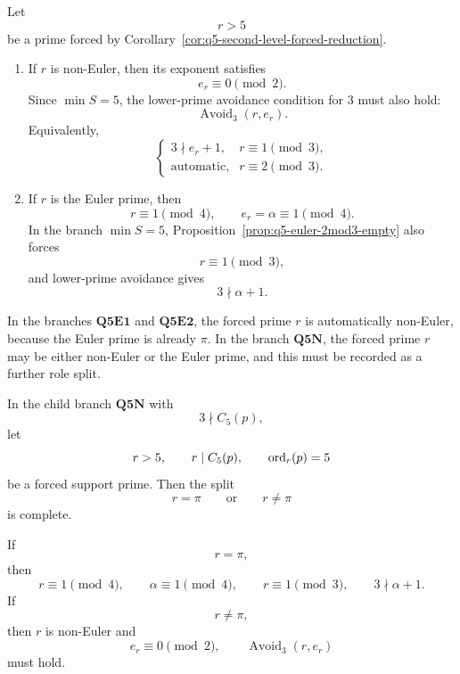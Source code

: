 \begin{definition}[Exponent schemas for second-level forced primes in the \(q=5\) branch]
\label{def:q5-second-level-forced-prime-schemas}
Let
\[
  r>5
\]
be a prime forced by Corollary~\ref{cor:q5-second-level-forced-reduction}.

\begin{enumerate}[label=(\roman*),leftmargin=2.2em]

\item If \(r\) is non-Euler, then its exponent satisfies
      \[
        e_r\equiv0\pmod2.
      \]
      Since \(\min S=5\), the lower-prime avoidance condition for \(3\) must
      also hold:
      \[
        \operatorname{Avoid}_3(r,e_r).
      \]
      Equivalently,
      \[
        \begin{cases}
          3\nmid e_r+1, & r\equiv1\pmod3,\\[4pt]
          \text{automatic}, & r\equiv2\pmod3.
        \end{cases}
      \]

\item If \(r\) is the Euler prime, then
      \[
        r\equiv1\pmod4,
        \qquad
        e_r=\alpha\equiv1\pmod4.
      \]
      In the branch \(\min S=5\), Proposition~\ref{prop:q5-euler-2mod3-empty}
      also forces
      \[
        r\equiv1\pmod3,
      \]
      and lower-prime avoidance gives
      \[
        3\nmid \alpha+1.
      \]
\end{enumerate}

In the branches \(\mathbf{Q5E1}\) and \(\mathbf{Q5E2}\), the forced prime
\(r\) is automatically non-Euler, because the Euler prime is already \(\pi\).
In the branch \(\mathbf{Q5N}\), the forced prime \(r\) may be either non-Euler
or the Euler prime, and this must be recorded as a further role split.
\end{definition}

\begin{corollary}
\label{cor:q5n-forced-prime-role-split}
In the child branch \(\mathbf{Q5N}\) with
\[
  3\nmid C_5(p),
\]
let
\[
  r>5,
  \qquad
  r\mid C_5(p),
  \qquad
  \operatorname{ord}_r(p)=5
\]
be a forced support prime.  Then the split
\[
  r=\pi
  \qquad\text{or}\qquad
  r\ne\pi
\]
is complete.

If
\[
  r=\pi,
\]
then
\[
  r\equiv1\pmod4,
  \qquad
  \alpha\equiv1\pmod4,
  \qquad
  r\equiv1\pmod3,
  \qquad
  3\nmid\alpha+1.
\]
If
\[
  r\ne\pi,
\]
then \(r\) is non-Euler and
\[
  e_r\equiv0\pmod2,
  \qquad
  \operatorname{Avoid}_3(r,e_r)
\]
must hold.
\end{corollary}

